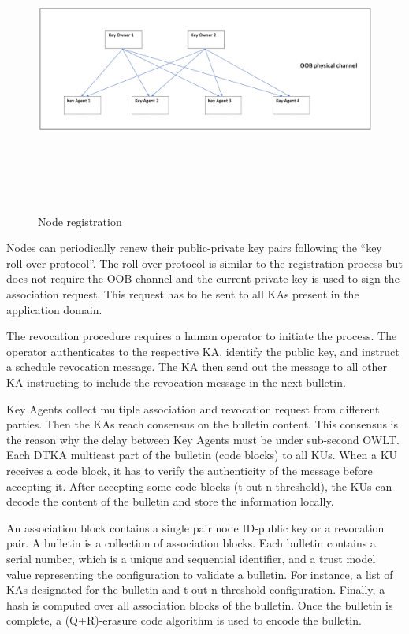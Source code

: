 \begin{figure}[htb]
\centering
\includegraphics[width=1 \linewidth, height=9.5cm]{images/node-regist.png} 
\caption{Node registration}
\label{fig:Node registration}
\end{figure}


Nodes can periodically renew their public-private key pairs following the ``key roll-over protocol''. The roll-over protocol is similar to the registration process but does not require the OOB channel and the current private key is used to sign the association request.  This request has to be sent to all KAs present in the application domain.

The revocation procedure requires a human operator to initiate the process. The operator authenticates to the respective KA, identify the public key, and instruct a schedule revocation message. The KA then send out the message to all other KA instructing to include the revocation message in the next bulletin.   


Key Agents collect multiple association and revocation request from different parties. Then the KAs reach consensus on the bulletin content. This consensus is the reason why the delay between Key Agents must be under sub-second OWLT. Each DTKA multicast part of the bulletin (code blocks) to all KUs. When a KU receives a code block, it has to verify the authenticity of the message before accepting it. After accepting some code blocks (t-out-n threshold), the KUs can decode the content of the bulletin and store the information locally. 


An association block contains a single pair node ID-public key or a revocation pair. A bulletin is a collection of association blocks. Each bulletin contains a serial number, which is a unique and sequential identifier, and a trust model value representing the configuration to validate a bulletin. For instance, a list of KAs designated for the bulletin and t-out-n threshold configuration. Finally, a hash is computed over all association blocks of the bulletin. Once the bulletin is complete, a (Q+R)-erasure code algorithm is used to encode the bulletin. 

